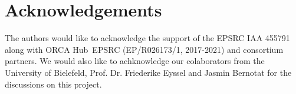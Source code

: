 \documentclass[letterpaper]{article} %
\begin{document}
\section{Acknowledgements}
The authors would like to acknowledge the support of the EPSRC IAA 455791 along with ORCA Hub~EPSRC (EP/R026173/1, 2017-2021) and consortium partners. We would also like to achknowledge our colaborators from the University of Bielefeld, Prof. Dr. Friederike Eyssel and Jasmin Bernotat for the discussions on this project. 
\vspace{-0.2cm}

 
\end{document}
